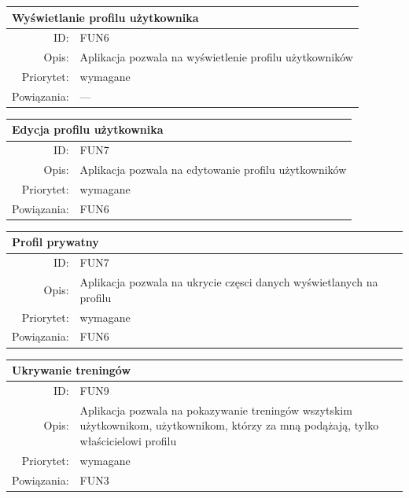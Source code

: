 \begin{center}
      \begin{tabular}{rp{10cm}}
	      \multicolumn{2}{l}{\textbf{Wyświetlanie profilu użytkownika}} \\
	      \hline
	      ID: & FUN6 \\
	      Opis: & Aplikacja pozwala na wyświetlenie profilu użytkowników \\
	      Priorytet: & wymagane \\
	      Powiązania: & --- \\
    \end{tabular}
\end{center}

\begin{center}
      \begin{tabular}{rp{10cm}}
	      \multicolumn{2}{l}{\textbf{Edycja profilu użytkownika}} \\
	      \hline
	      ID: & FUN7 \\
	      Opis: & Aplikacja pozwala na edytowanie profilu użytkowników \\
	      Priorytet: & wymagane \\
	      Powiązania: & FUN6 \\
    \end{tabular}
\end{center}

\begin{center}
      \begin{tabular}{rp{10cm}}
	      \multicolumn{2}{l}{\textbf{Profil prywatny}} \\
	      \hline
	      ID: & FUN7 \\
	      Opis: & Aplikacja pozwala na ukrycie częsci danych wyświetlanych na profilu \\
	      Priorytet: & wymagane \\
	      Powiązania: & FUN6 \\
    \end{tabular}
\end{center}

\begin{center}
      \begin{tabular}{rp{10cm}}
	      \multicolumn{2}{l}{\textbf{Ukrywanie treningów}} \\
	      \hline
	      ID: & FUN9 \\
	      Opis: & Aplikacja pozwala na pokazywanie treningów wszytskim użytkownikom, użytkownikom, którzy za mną podążają, tylko właścicielowi profilu \\
	      Priorytet: & wymagane \\
	      Powiązania: & FUN3 \\
    \end{tabular}
\end{center}

